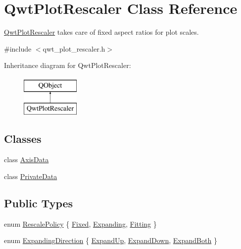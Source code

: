 \hypertarget{class_qwt_plot_rescaler}{\section{Qwt\-Plot\-Rescaler Class Reference}
\label{class_qwt_plot_rescaler}
}


\hyperlink{class_qwt_plot_rescaler}{Qwt\-Plot\-Rescaler} takes care of fixed aspect ratios for plot scales.  




{\ttfamily \#include $<$qwt\-\_\-plot\-\_\-rescaler.\-h$>$}

Inheritance diagram for Qwt\-Plot\-Rescaler\-:\begin{figure}[H]
\begin{center}
\leavevmode
\includegraphics[height=2.000000cm]{class_qwt_plot_rescaler}
\end{center}
\end{figure}
\subsection*{Classes}
\begin{DoxyCompactItemize}
\item 
class \hyperlink{class_qwt_plot_rescaler_1_1_axis_data}{Axis\-Data}
\item 
class \hyperlink{class_qwt_plot_rescaler_1_1_private_data}{Private\-Data}
\end{DoxyCompactItemize}
\subsection*{Public Types}
\begin{DoxyCompactItemize}
\item 
enum \hyperlink{class_qwt_plot_rescaler_a6a614b832876a7641cb5410ba81d9d6a}{Rescale\-Policy} \{ \hyperlink{class_qwt_plot_rescaler_a6a614b832876a7641cb5410ba81d9d6aab8f9ce10c092bee12de74b05a46b6e9c}{Fixed}, 
\hyperlink{class_qwt_plot_rescaler_a6a614b832876a7641cb5410ba81d9d6aac0b9db1ea3c5666792c2a9813ca5d7e1}{Expanding}, 
\hyperlink{class_qwt_plot_rescaler_a6a614b832876a7641cb5410ba81d9d6aa30a43b11d9df23f66110b65d1e249db1}{Fitting}
 \}
\item 
enum \hyperlink{class_qwt_plot_rescaler_a1c314e9513cef076a79381111aa67585}{Expanding\-Direction} \{ \hyperlink{class_qwt_plot_rescaler_a1c314e9513cef076a79381111aa67585a10adc202ca84a06179b905db6802668c}{Expand\-Up}, 
\hyperlink{class_qwt_plot_rescaler_a1c314e9513cef076a79381111aa67585a856d9a1fe75ed6398a1b3c4b60f3fbfd}{Expand\-Down}, 
\hyperlink{class_qwt_plot_rescaler_a1c314e9513cef076a79381111aa67585a3dfb8208dfb62200761e4221763db033}{Expand\-Both}
 \}
\end{DoxyCompactItemize}
